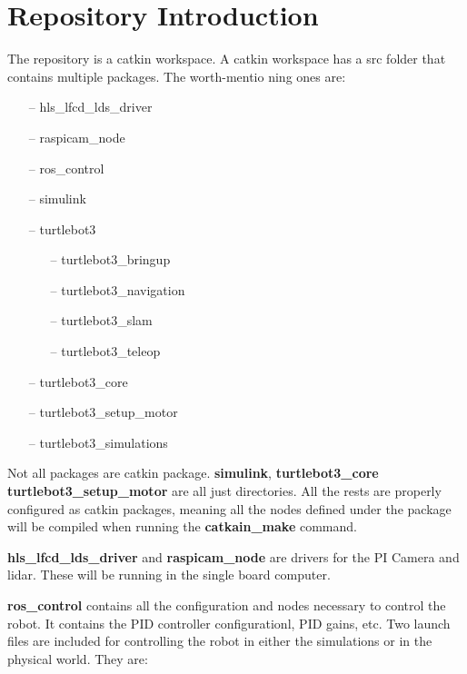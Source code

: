 \documentclass[12]{article}
\begin{document}
\section{Repository Introduction}
The repository is a catkin workspace. A catkin workspace has a src folder that contains multiple packages. The worth-mentio ning ones are:
\begin{itemize}
	\item[--] hls\_lfcd\_lds\_driver
    \item[--] raspicam\_node
    \item[--] ros\_control
    \item[--] simulink
    \item[--] turtlebot3
    \begin{itemize}
        \item[--] turtlebot3\_bringup
        \item[--] turtlebot3\_navigation
        \item[--] turtlebot3\_slam
        \item[--] turtlebot3\_teleop
    \end {itemize}
    \item[--] turtlebot3\_core
    \item[--] turtlebot3\_setup\_motor
    \item[--] turtlebot3\_simulations
\end{itemize} 

Not all packages are catkin package. \textbf{simulink}, \textbf{turtlebot3\_core} \textbf{turtlebot3\_setup\_motor} are all just directories. 
All the rests are properly configured as catkin packages, meaning all the nodes defined under the package will be compiled when running the \textbf{catkain\_make} command. 

\textbf{hls\_lfcd\_lds\_driver} and \textbf{raspicam\_node} are drivers for the PI Camera and lidar. 
These will be running in the single board computer. 

\textbf{ros\_control} contains all the configuration and nodes necessary to control the robot. 
It contains the PID controller configurationl, PID gains, etc.
Two launch files are included for controlling the robot in either the simulations or in the physical world. They are:
\end{document}
